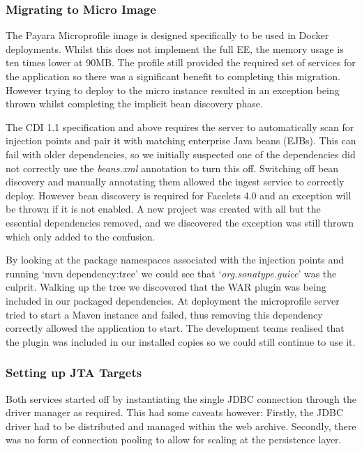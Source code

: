 \subsubsection{Migrating to Micro Image}
\par
The Payara Microprofile image is designed specifically to be used in Docker deployments. Whilst this does not implement the full EE, the memory usage is ten times lower at 90MB. The profile still provided the required set of services for the application so there was a significant benefit to completing this migration. However trying to deploy to the micro instance resulted in an exception being thrown whilst completing the implicit bean discovery phase. 

\par
The CDI 1.1 specification and above requires the server to automatically scan for injection points and pair it with matching enterprise Java beans (EJBs). This can fail with older dependencies, so we initially suspected one of the dependencies did not correctly use the \textit{beans.xml} annotation to turn this off.
\newline
Switching off bean discovery and manually annotating them allowed the ingest service to correctly deploy. However bean discovery is required for Facelets 4.0 and an exception will be thrown if it is not enabled. A new project was created with all but the essential dependencies removed, and we discovered the exception was still thrown which only added to the confusion. 

\par
By looking at the package namespaces associated with the injection points and running `mvn dependency:tree' we could see that `\textit{org.sonatype.guice}' was the culprit. Walking up the tree we discovered that the WAR plugin was being included in our packaged dependencies. At deployment the microprofile server tried to start a Maven instance and failed, thus removing this dependency correctly allowed the application to start. The development teams realised that the plugin was included in our installed copies so we could still continue to use it.

\label{JTA_Targets}
\subsubsection{Setting up JTA Targets}
Both services started off by instantiating the single JDBC connection through the driver manager as required. This had some caveats however: Firstly, the JDBC driver had to be distributed and managed within the web archive. Secondly, there was no form of connection pooling to allow for scaling at the persistence layer.

